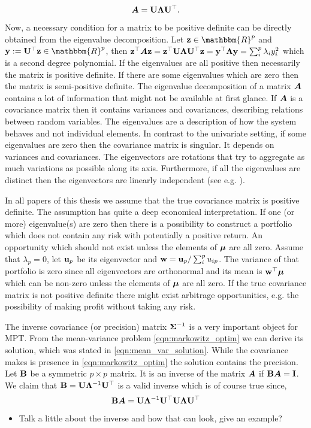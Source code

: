\documentclass[]{book}
\begin{document}
\begin{equation}\label{eqn:eigenvalue_decomp}
	\mbox{\boldmath$A$} = \mathbf{U} \boldsymbol{\Lambda} \mathbf{U} ^\top.
\end{equation}

Now, a necessary condition for a matrix to be positive definite can be directly obtained from the eigenvalue decomposition. 
Let $\bz\in \mathbbm{R}^p$ and $\by := \bU^\top \bz \in \mathbbm{R}^p$, then $\mathbf{z}^\top \mbox{\boldmath$A$} \mathbf{z} = \mathbf{z}^\top \mathbf{U} \boldsymbol{\Lambda} \mathbf{U} ^\top \mathbf{z} = \mathbf{y}^\top \boldsymbol{\Lambda} \mathbf{y} = \sum_i^p \lambda_i y_i^2$ which is a second degree polynomial. 
If the eigenvalues are all positive then necessarily the matrix is positive definite. 
If there are some eigenvalues which are zero then the matrix is semi-positive definite. 
The eigenvalue decomposition of a matrix $\mbox{\boldmath$A$}$ contains a lot of information that might not be available at first glance. 
If $\mbox{\boldmath$A$}$ is a covariance matrix then it contains variances and covariances, describing relations between random variables. 
The eigenvalues are a description of how the system behaves and not individual elements. 
In contrast to the univariate setting, if some eigenvalues are zero then the covariance matrix is singular. 
It depends on variances and covariances.
The eigenvectors are rotations that try to aggregate as much variations as possible along its axis.
Furthermore, if all the eigenvalues are distinct then the eigenvectors are linearly independent (see e.g. \citet[thm 21.4.1]{harville1997matrix}).

In all papers of this thesis we assume that the true covariance matrix is positive definite. 
The assumption has quite a deep economical interpretation.
If one (or more) eigenvalue(s) are zero then there is a possibility to construct a portfolio which does not contain any risk with potentially a positive return. 
An opportunity which should not exist unless the elements of $\mbox{\boldmath$\mu$}$ are all zero.
Assume that $\lambda_p=0$, let $\mathbf{u}_p$ be its eigenvector and $\mathbf{w} = \mathbf{u}_p / \sum_i^p u_{ip} $. The variance of that portfolio is zero since all eigenvectors are orthonormal and its mean is $\mathbf{w}^\top \mbox{\boldmath$\mu$}$ which can be non-zero unless the elements of $\mbox{\boldmath$\mu$}$ are all zero. 
If the true covariance matrix is not positive definite there might exist arbitrage opportunities, e.g. the possibility of making profit without taking any risk.

The inverse covariance (or precision) matrix $\mathbf{\Sigma}^{-1}$ is a very important object for MPT. 
From the mean-variance problem \eqref{eqn:markowitz_optim} we can derive its solution, which was stated in \eqref{eqn:mean_var_solution}. 
While the covariance makes is presence in \eqref{eqn:markowitz_optim} the solution contains the precision. 
Let $\mathbf{B}$ be a symmetric $p \times p$ matrix. It is an inverse of the matrix $\mbox{\boldmath$A$}$ if $\mathbf{B} \mbox{\boldmath$A$} = \mathbf{I}$. 
We claim that $\mathbf{B} = \mathbf{U} \boldsymbol{\Lambda}^{-1} \mathbf{U}^\top$ is a valid inverse which is of course true since,
$$
\mathbf{B} \mbox{\boldmath$A$} = \mathbf{U} \boldsymbol{\Lambda}^{-1} \mathbf{U}^\top \mathbf{U} \boldsymbol{\Lambda} \mathbf{U}^\top
$$
\begin{itemize}
	\item Talk a little about the inverse and how that can look, give an example?
\end{itemize}
\end{document}
